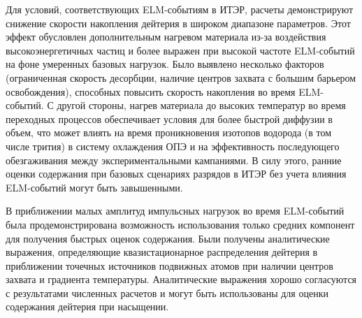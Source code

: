 Для условий, соответствующих ELM-событиям в ИТЭР, расчеты демонстрируют снижение скорости накопления дейтерия в широком диапазоне параметров. Этот эффект обусловлен дополнительным нагревом материала из-за воздействия высокоэнергетичных частиц и более выражен при высокой частоте ELM-событий на фоне умеренных базовых нагрузок. Было выявлено несколько факторов (ограниченная скорость десорбции, наличие центров захвата с большим барьером освобождения), способных повысить скорость накопления во время ELM-событий. С другой стороны, нагрев материала до высоких температур во время переходных процессов обеспечивает условия для более быстрой диффузии в объем, что может влиять на время проникновения изотопов водорода (в том числе трития) в систему охлаждения ОПЭ и на эффективность последующего обезгаживания между экспериментальными кампаниями. В силу этого, ранние оценки содержания при базовых сценариях разрядов в ИТЭР без учета влияния ELM-событий могут быть завышенными. 

В приближении малых амплитуд импульсных нагрузок во время ELM-событий была продемонстрирована возможность использования только средних компонент для получения быстрых оценок содержания. Были получены аналитические выражения, определяющие квазистационарное распределения дейтерия в приближении точечных источников подвижных атомов при наличии центров захвата и градиента температуры. Аналитические выражения хорошо согласуются с результатами численных расчетов и могут быть использованы для оценки содержания дейтерия при насыщении.


\clearpage
